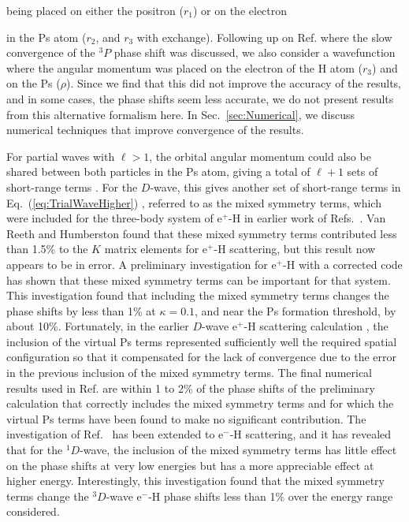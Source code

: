 \documentclass[preprint,showpacs,showkeys,preprintnumbers,amsmath,amssymb,longbibliography,pra,aps]{revtex4-1}
\begin{document}
being placed on either the positron ($r_1$) or on the electron {in the Ps
atom ($r_2$, and $r_3$
with exchange). Following up on Ref. \cite{VanReeth2004} where the slow 
convergence of the $^3P$ phase shift was discussed, we also consider a 
wavefunction where the angular momentum was placed on the electron of the H 
atom ($r_3$) and on the Ps ($\rho$). Since we find that this did not improve the
accuracy of the results, and in some cases, the phase shifts seem less
accurate, we do not present results from this alternative
formalism here.
In Sec.~\ref{sec:Numerical}, we discuss numerical techniques that improve
convergence of the results.

For partial waves with $\ell>1$, the orbital angular momentum could also be 
shared between both particles in the Ps atom, giving a total of
$\ell + 1$ sets of short-range terms \cite{Schwartz1961a}. For the
$D$-wave, this gives another set of short-range terms in
Eq.~(\ref{eq:TrialWaveHigher})
\cite{Humberston1997,VanReethThesis,BrownThesis}, referred to as the mixed
symmetry terms, which were included for the three-body system of e$^+$-H
in earlier work of
Refs.~\cite{Brown1985a,BrownThesis,WattsThesis,Humberston1997,VanReeth1997}.
Van Reeth and Humberston \cite{VanReeth1997} found that these
mixed symmetry terms contributed less than 1.5\% to the $K$ matrix elements
for e$^+$-H scattering, but this result now appears to be in error.
A preliminary investigation for e$^+$-H \cite{VanReeth2015} with a corrected
code has shown 
that these mixed symmetry terms can be important for that 
system. This investigation found that
including the mixed symmetry terms changes
the phase shifts by less than 1\% at $\kappa = 0.1$, and near the Ps formation
threshold, by about 10\%. Fortunately, in the earlier $D$-wave e$^+$-H
scattering
calculation \cite{Humberston1997}, the inclusion of the virtual Ps terms
represented sufficiently well the required spatial configuration so that it
compensated for the lack of convergence due to the
error in the previous inclusion of the mixed symmetry
terms. The final numerical results used in Ref. \cite{VanReeth1997} are
within 1 to 2\% of the phase shifts of the preliminary
calculation \cite{VanReeth2015} that correctly
includes the mixed symmetry terms and for which the virtual Ps terms have
been found to make no significant contribution. The investigation of
Ref.~\cite{VanReeth2015} has been extended to
e$^-$-H scattering, and it has revealed that
for the $^1D$-wave, the inclusion of the 
mixed symmetry terms has little effect on the phase shifts at very low
energies but has a more appreciable effect at higher energy. Interestingly,
this investigation found that the mixed symmetry terms change the
$^3D$-wave e$^-$-H phase shifts less than 1\% over the energy
range considered.

}
\end{document}
